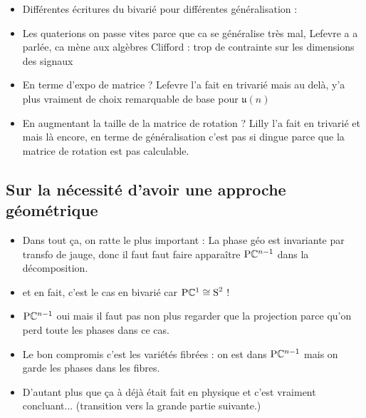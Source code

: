 \begin{itemize}
	
	\item Différentes écritures du bivarié pour différentes généralisation :
	
	\item Les quaterions on passe vites parce que ca se généralise très mal, Lefevre a a parlée, ca mène aux algèbres Clifford : trop de contrainte sur les dimensions des signaux
	
	\item En terme d'expo de matrice ? Lefevre \cite[sec. I.3]{lefevre_polarization_2021} l'a fait en trivarié mais au delà, y'a plus vraiment de choix remarquable de base pour $\mathfrak{u}(n)$
	
	\item En augmentant la taille de la matrice de rotation ? Lilly \cite{lilly_modulated_2011} l'a fait en trivarié et mais là encore, en terme de généralisation c'est pas si dingue parce que la matrice de rotation est pas calculable.
	
\end{itemize}
	


\subsection{Sur la nécessité d'avoir une approche géométrique}\label{subsec:aller_plus_loin}
\begin{itemize}
	
	\item Dans tout ça, on ratte le plus important : La phase géo est invariante par transfo de jauge, donc il faut faut faire apparaître $\text{\normalfont P}\mathbb{C}^{n-1}$ dans la décomposition.
	
	\item et en fait, c'est le cas en bivarié car $\text{\normalfont P}\mathbb{C}^{1}\cong \text{\normalfont S}^{2}$ !
	
	\item $\text{\normalfont P}\mathbb{C}^{n-1}$ oui mais il faut pas non plus regarder que la projection parce qu'on perd toute les phases dans ce cas.
	
	\item Le bon compromis c'est les variétés fibrées : on est dans $\text{\normalfont P}\mathbb{C}^{n-1}$ mais on garde les phases dans les fibres.
	
	\item D'autant plus que ça à déjà était fait en physique et c'est vraiment concluant... (transition vers la grande partie suivante.)
	
\end{itemize}





